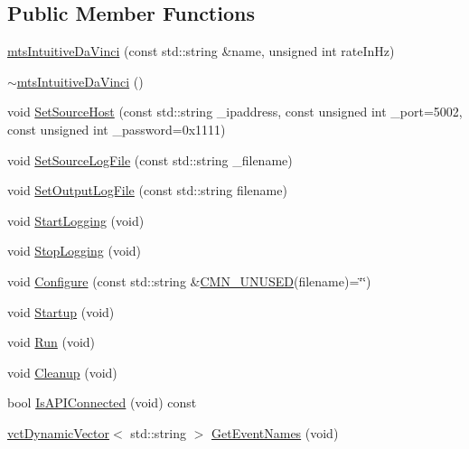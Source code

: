 \subsection*{Public Member Functions}
\begin{DoxyCompactItemize}
\item 
\hyperlink{classmts_intuitive_da_vinci_a8d26d40fcc5c8051b78d9f3492444124}{mts\+Intuitive\+Da\+Vinci} (const std\+::string \&name, unsigned int rate\+In\+Hz)
\item 
\hyperlink{classmts_intuitive_da_vinci_abd5651fd920d3b747c45e77f2fb6ddfd}{$\sim$mts\+Intuitive\+Da\+Vinci} ()
\item 
void \hyperlink{classmts_intuitive_da_vinci_aee33ea9b82f51a020f8be32fe9f07368}{Set\+Source\+Host} (const std\+::string \+\_\+ipaddress, const unsigned int \+\_\+port=5002, const unsigned int \+\_\+password=0x1111)
\item 
void \hyperlink{classmts_intuitive_da_vinci_afbf403f4b19fb9151d442d509390a7f3}{Set\+Source\+Log\+File} (const std\+::string \+\_\+filename)
\item 
void \hyperlink{classmts_intuitive_da_vinci_ae00f71b53c921f5640b5d9612f493d7e}{Set\+Output\+Log\+File} (const std\+::string filename)
\item 
void \hyperlink{classmts_intuitive_da_vinci_a0c4255c252999d91d3d983e7c9e01e6f}{Start\+Logging} (void)
\item 
void \hyperlink{classmts_intuitive_da_vinci_a55c2ab4b4af7da54bc185149a1884795}{Stop\+Logging} (void)
\item 
void \hyperlink{classmts_intuitive_da_vinci_a98409faa6d3f51b2bd153df262b4db59}{Configure} (const std\+::string \&\hyperlink{cmn_portability_8h_a021894e2626935fa2305434b1e893ff6}{C\+M\+N\+\_\+\+U\+N\+U\+S\+E\+D}(filename)=\char`\"{}\char`\"{})
\item 
void \hyperlink{classmts_intuitive_da_vinci_a47328f5b6d6bfc477d9d53e1d829f144}{Startup} (void)
\item 
void \hyperlink{classmts_intuitive_da_vinci_a8b6c9c77958c2726d1e7ae46d0e34ee2}{Run} (void)
\item 
void \hyperlink{classmts_intuitive_da_vinci_ac9c5b49157176eee514f74585a88d994}{Cleanup} (void)
\item 
bool \hyperlink{classmts_intuitive_da_vinci_a55eab0998d7da801e07b0cf4f5f36701}{Is\+A\+P\+I\+Connected} (void) const 
\item 
\hyperlink{classvct_dynamic_vector}{vct\+Dynamic\+Vector}$<$ std\+::string $>$ \hyperlink{classmts_intuitive_da_vinci_a3ba221cd74097609b03a8061b50361ee}{Get\+Event\+Names} (void)
\end{DoxyCompactItemize}

